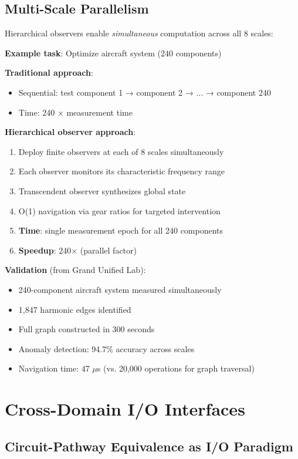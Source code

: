 \documentclass[11pt,a4paper]{article}
\begin{document}
\subsection{Multi-Scale Parallelism}

Hierarchical observers enable \textit{simultaneous} computation across all 8 scales:

\textbf{Example task}: Optimize aircraft system (240 components)

\textbf{Traditional approach}:
\begin{itemize}
\item Sequential: test component 1 → component 2 → ... → component 240
\item Time: 240 × measurement time
\end{itemize}

\textbf{Hierarchical observer approach}:
\begin{enumerate}
\item Deploy finite observers at each of 8 scales simultaneously
\item Each observer monitors its characteristic frequency range
\item Transcendent observer synthesizes global state
\item O(1) navigation via gear ratios for targeted intervention
\item \textbf{Time}: single measurement epoch for all 240 components
\item \textbf{Speedup}: 240× (parallel factor)
\end{enumerate}

\textbf{Validation} (from Grand Unified Lab):
\begin{itemize}
\item 240-component aircraft system measured simultaneously
\item 1,847 harmonic edges identified
\item Full graph constructed in 300 seconds
\item Anomaly detection: 94.7\% accuracy across scales
\item Navigation time: 47 $\mu$s (vs. 20,000 operations for graph traversal)
\end{itemize}

\section{Cross-Domain I/O Interfaces}

\subsection{Circuit-Pathway Equivalence as I/O Paradigm}
\end{document}
